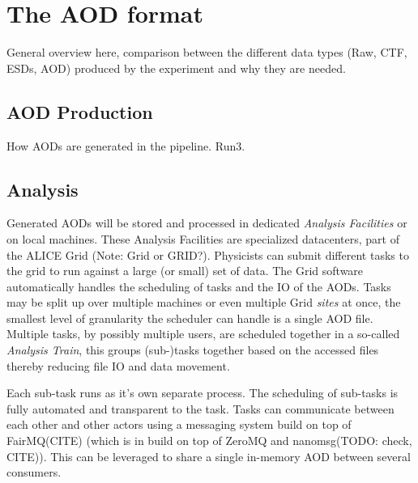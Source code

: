 \documentclass{report}
\begin{document}
\chapter{The AOD format}
General overview here, comparison between the different data types (Raw, CTF, ESDs, AOD) produced by the experiment and why they are needed.
\section{AOD Production}
How AODs are generated in the pipeline. Run3.
\section{Analysis}
Generated AODs will be stored and processed in dedicated {\em Analysis Facilities} or on local machines. These Analysis Facilities are specialized datacenters, part of the ALICE
Grid (Note: Grid or GRID?). Physicists can submit different tasks to the grid to run against a large (or small) set of data. The Grid software automatically handles the
 scheduling of tasks and the IO of the AODs. Tasks may be split up over multiple machines or even multiple Grid {\em sites} at once, the smallest level of granularity the scheduler can handle
 is a single AOD file. Multiple tasks, by possibly multiple users, are scheduled together in a so-called {\em Analysis Train}, this groups (sub-)tasks together based
 on the accessed files thereby reducing file IO and data movement.
\par Each sub-task runs as it's own separate process. The scheduling of sub-tasks is fully automated and transparent to the task.
 Tasks can communicate between each other and other actors using a messaging system build on top of FairMQ(CITE) (which is in build on top of ZeroMQ and nanomsg(TODO: check, CITE)). This can be leveraged
 to share a single in-memory AOD between several consumers.
\end{document}
